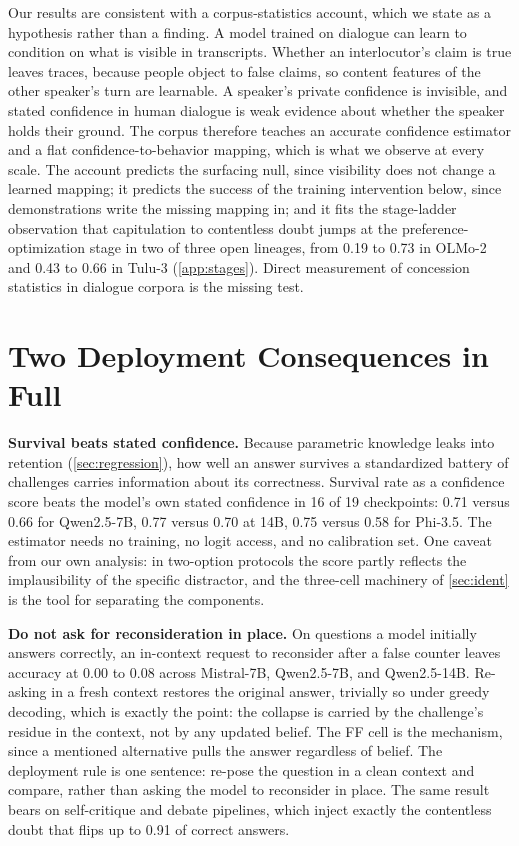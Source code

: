 \documentclass{article}
\begin{document}
Our results are consistent with a corpus-statistics account, which we state as a hypothesis rather than a finding. A model trained on dialogue can learn to condition on what is visible in transcripts. Whether an interlocutor's claim is true leaves traces, because people object to false claims, so content features of the other speaker's turn are learnable. A speaker's private confidence is invisible, and stated confidence in human dialogue is weak evidence about whether the speaker holds their ground. The corpus therefore teaches an accurate confidence estimator and a flat confidence-to-behavior mapping, which is what we observe at every scale. The account predicts the surfacing null, since visibility does not change a learned mapping; it predicts the success of the training intervention below, since demonstrations write the missing mapping in; and it fits the stage-ladder observation that capitulation to contentless doubt jumps at the preference-optimization stage in two of three open lineages, from 0.19 to 0.73 in OLMo-2 and 0.43 to 0.66 in Tulu-3 (\cref{app:stages}). Direct measurement of concession statistics in dialogue corpora is the missing test.


\section{Two Deployment Consequences in Full}
\label{app:conseq}
\textbf{Survival beats stated confidence.} Because parametric knowledge leaks into retention (\cref{sec:regression}), how well an answer survives a standardized battery of challenges carries information about its correctness. Survival rate as a confidence score beats the model's own stated confidence in 16 of 19 checkpoints: 0.71 versus 0.66 for Qwen2.5-7B, 0.77 versus 0.70 at 14B, 0.75 versus 0.58 for Phi-3.5. The estimator needs no training, no logit access, and no calibration set. One caveat from our own analysis: in two-option protocols the score partly reflects the implausibility of the specific distractor, and the three-cell machinery of \cref{sec:ident} is the tool for separating the components.

\textbf{Do not ask for reconsideration in place.} On questions a model initially answers correctly, an in-context request to reconsider after a false counter leaves accuracy at 0.00 to 0.08 across Mistral-7B, Qwen2.5-7B, and Qwen2.5-14B. Re-asking in a fresh context restores the original answer, trivially so under greedy decoding, which is exactly the point: the collapse is carried by the challenge's residue in the context, not by any updated belief. The FF cell is the mechanism, since a mentioned alternative pulls the answer regardless of belief. The deployment rule is one sentence: re-pose the question in a clean context and compare, rather than asking the model to reconsider in place. The same result bears on self-critique and debate pipelines, which inject exactly the contentless doubt that flips up to 0.91 of correct answers.
\end{document}
